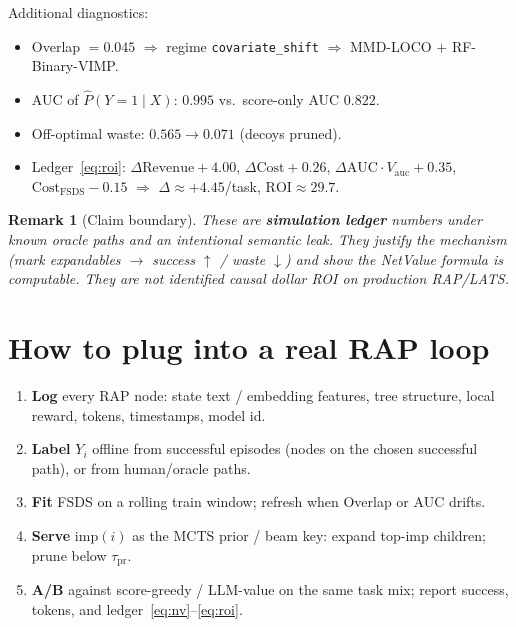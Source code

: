 \documentclass[11pt]{article}
\newtheorem{remark}{Remark}
\newcommand{\imp}{\mathrm{imp}}
\newcommand{\ROI}{\mathrm{ROI}}
\begin{document}
\vspace{0.5em}
\noindent
Additional diagnostics:
\begin{itemize}[leftmargin=1.2em]
  \item Overlap $=0.045$ $\Rightarrow$ regime \texttt{covariate\_shift}
        $\Rightarrow$ MMD-LOCO $+$ RF-Binary-VIMP.
  \item AUC of $\widehat{P}(Y{=}1\mid X)$: $\mathbf{0.995}$ vs.\ score-only AUC $0.822$.
  \item Off-optimal waste: $0.565\to 0.071$ (decoys pruned).
  \item Ledger~\eqref{eq:roi}: $\Delta\mathrm{Revenue}{+}4.00$,
        $\Delta\mathrm{Cost}{+}0.26$, $\Delta\mathrm{AUC}\cdot V_{\mathrm{auc}}{+}0.35$,
        $\mathrm{Cost}_{\mathrm{FSDS}}{-}0.15$
        $\Rightarrow$ $\Delta\approx\mathbf{+4.45}$/task, $\ROI\approx\mathbf{29.7}$.
\end{itemize}

\begin{remark}[Claim boundary]
These are \textbf{simulation ledger} numbers under known oracle paths and
an intentional semantic leak. They justify the mechanism
(mark expandables $\to$ success $\uparrow$ / waste $\downarrow$) and show the
NetValue formula is computable. They are \emph{not} identified causal
dollar ROI on production RAP/LATS.
\end{remark}

\section{How to plug into a real RAP loop}
\label{sec:plug}

\begin{enumerate}[leftmargin=1.3em]
  \item \textbf{Log} every RAP node: state text / embedding features,
        tree structure, local reward, tokens, timestamps, model id.
  \item \textbf{Label} $Y_i$ offline from successful episodes
        (nodes on the chosen successful path), or from human/oracle paths.
  \item \textbf{Fit} FSDS on a rolling train window; refresh when Overlap
        or AUC drifts.
  \item \textbf{Serve} $\imp(i)$ as the MCTS prior / beam key:
        expand top-$\imp$ children; prune below $\tau_{\mathrm{pr}}$.
  \item \textbf{A/B} against score-greedy / LLM-value on the same task
        mix; report success, tokens, and ledger~\eqref{eq:nv}--\eqref{eq:roi}.
\end{enumerate}
\end{document}

